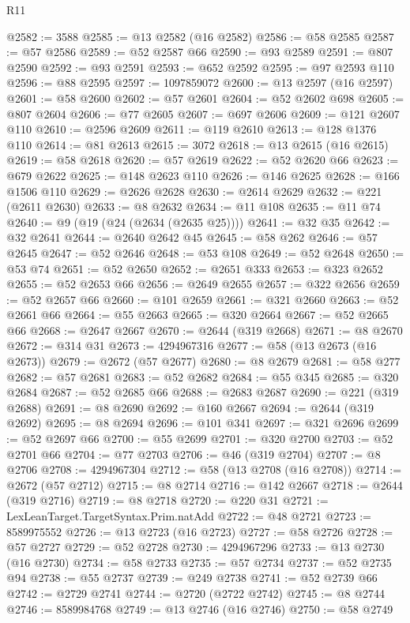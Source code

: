 \begin{lexlean}{R11}
\begin{coremodule}
@2582 := 3588
@2585 := @13 @2582 (@16 @2582)
@2586 := @58 @2585
@2587 := @57 @2586
@2589 := @52 @2587 @66
@2590 := @93 @2589
@2591 := @807 @2590
@2592 := @93 @2591
@2593 := @652 @2592
@2595 := @97 @2593 @110
@2596 := @88 @2595
@2597 := 1097859072
@2600 := @13 @2597 (@16 @2597)
@2601 := @58 @2600
@2602 := @57 @2601
@2604 := @52 @2602 @698
@2605 := @807 @2604
@2606 := @77 @2605
@2607 := @697 @2606
@2609 := @121 @2607 @110
@2610 := @2596 @2609
@2611 := @119 @2610
@2613 := @128 @1376 @110
@2614 := @81 @2613
@2615 := 3072
@2618 := @13 @2615 (@16 @2615)
@2619 := @58 @2618
@2620 := @57 @2619
@2622 := @52 @2620 @66
@2623 := @679 @2622
@2625 := @148 @2623 @110
@2626 := @146 @2625
@2628 := @166 @1506 @110
@2629 := @2626 @2628
@2630 := @2614 @2629
@2632 := @221 (@2611 @2630)
@2633 := @8 @2632
@2634 := @11 @108
@2635 := @11 @74
@2640 := @9 (@19 (@24 (@2634 (@2635 @25))))
@2641 := @32 @35
@2642 := @32 @2641
@2644 := @2640 @2642 @45
@2645 := @58 @262
@2646 := @57 @2645
@2647 := @52 @2646
@2648 := @53 @108
@2649 := @52 @2648
@2650 := @53 @74
@2651 := @52 @2650
@2652 := @2651 @333
@2653 := @323 @2652
@2655 := @52 @2653 @66
@2656 := @2649 @2655
@2657 := @322 @2656
@2659 := @52 @2657 @66
@2660 := @101 @2659
@2661 := @321 @2660
@2663 := @52 @2661 @66
@2664 := @55 @2663
@2665 := @320 @2664
@2667 := @52 @2665 @66
@2668 := @2647 @2667
@2670 := @2644 (@319 @2668)
@2671 := @8 @2670
@2672 := @314 @31
@2673 := 4294967316
@2677 := @58 (@13 @2673 (@16 @2673))
@2679 := @2672 (@57 @2677)
@2680 := @8 @2679
@2681 := @58 @277
@2682 := @57 @2681
@2683 := @52 @2682
@2684 := @55 @345
@2685 := @320 @2684
@2687 := @52 @2685 @66
@2688 := @2683 @2687
@2690 := @221 (@319 @2688)
@2691 := @8 @2690
@2692 := @160 @2667
@2694 := @2644 (@319 @2692)
@2695 := @8 @2694
@2696 := @101 @341
@2697 := @321 @2696
@2699 := @52 @2697 @66
@2700 := @55 @2699
@2701 := @320 @2700
@2703 := @52 @2701 @66
@2704 := @77 @2703
@2706 := @46 (@319 @2704)
@2707 := @8 @2706
@2708 := 4294967304
@2712 := @58 (@13 @2708 (@16 @2708))
@2714 := @2672 (@57 @2712)
@2715 := @8 @2714
@2716 := @142 @2667
@2718 := @2644 (@319 @2716)
@2719 := @8 @2718
@2720 := @220 @31
@2721 := LexLeanTarget.TargetSyntax.Prim.natAdd
@2722 := @48 @2721
@2723 := 8589975552
@2726 := @13 @2723 (@16 @2723)
@2727 := @58 @2726
@2728 := @57 @2727
@2729 := @52 @2728
@2730 := 4294967296
@2733 := @13 @2730 (@16 @2730)
@2734 := @58 @2733
@2735 := @57 @2734
@2737 := @52 @2735 @94
@2738 := @55 @2737
@2739 := @249 @2738
@2741 := @52 @2739 @66
@2742 := @2729 @2741
@2744 := @2720 (@2722 @2742)
@2745 := @8 @2744
@2746 := 8589984768
@2749 := @13 @2746 (@16 @2746)
@2750 := @58 @2749

\end{coremodule}
\end{lexlean}
